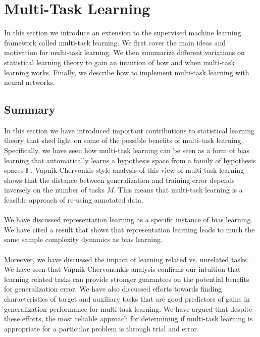 \chapter{Multi-Task Learning}
\label{multi-task_learning}
In this section we introduce an extension to the supervised machine learning framework called multi-task learning. We first cover the main ideas and motivation for multi-task learning. We then summarize different variations on statistical learning theory to gain an intuition of how and when multi-task learning works. Finally, we describe how to implement multi-task learning with neural networks.







\section{Summary}
In this section we have introduced important contributions to statistical learning theory that shed light on some of the possible benefits of multi-task learning. Specifically, we have seen how multi-task learning can be seen as a form of bias learning that automatically learns a hypothesis space from a family of hypothesis spaces $\mathbb{H}$. Vapnik-Chervonkis style analysis of this view of multi-task learning shows that the distance between generalization and training error depends inversely on the number of tasks $M$. This means that multi-task learning is a feasible approach of re-using annotated data.
\\\\
We have discussed representation learning as a specific instance of bias learning. We have cited a result that shows that representation learning leads to much the same sample complexity dynamics as bias learning.
\\\\
Moreover, we have discussed the impact of learning related vs. unrelated tasks. We have seen that Vapnik-Chervonenkis analysis confirms our intuition that learning related tasks can provide stronger guarantees on the potential benefits for generalization error. We have also discussed efforts towards finding characteristics of target and auxiliary tasks that are good predictors of gains in generalization performance for multi-task learning. We have argued that despite these efforts, the most reliable approach for determining if multi-task learning is appropriate for a particular problem is through trial and error.
